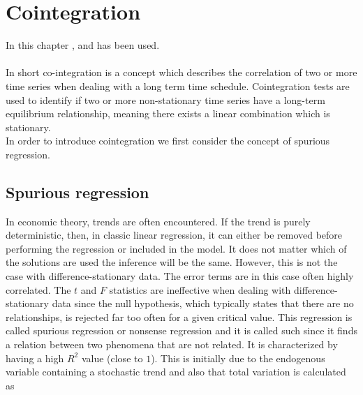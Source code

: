 \chapter{Cointegration}\label{chap:Coint}
In this chapter \cite{Analysis_of_integrated_and_cointegrated_time_series_with_R}, \cite{Cointegration_intro} and \cite{co-Integration_and_error_correction} has been used. \\\\
\noindent In short co-integration is a concept which describes the correlation of two or more time series when dealing with a long term time schedule. Cointegration tests are used to identify if two or more non-stationary time series have a long-term equilibrium relationship, meaning there exists a linear combination which is stationary.\\
\noindent In order to introduce cointegration we first consider the concept of spurious regression.



\section{Spurious regression}
In economic theory, trends are often encountered. If the trend is purely deterministic, then, in classic linear regression, it can either be removed before performing the regression or included in the model. It does not matter which of the solutions are used the inference will be the same. However, this is not the case with difference-stationary data. The error terms are in this case often highly correlated. The $t$ and $F$ statistics are ineffective when dealing with difference-stationary data since the null hypothesis, which typically states that there are no relationships, is rejected far too often for a given critical value. This regression is called spurious regression or nonsense regression and it is called such since it finds a relation between two phenomena that are not related. It is characterized by having a high $R^2$ value (close to $1$). This is initially due to the endogenous variable containing a stochastic trend and also that total variation is calculated as


